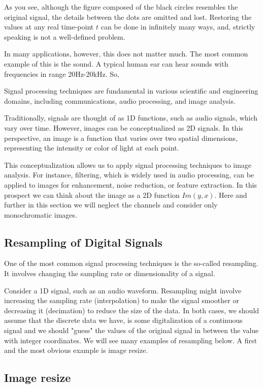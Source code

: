 \documentclass[11pt]{book}
\begin{document}
 
As you see, although the figure composed of the black circles resembles the original signal, the details between the dots are omitted and lost. Restoring the values at any real time-point $t$ can be done in infinitely many ways, and, strictly speaking is not a well-defined problem.

In many applications, however, this does not matter much. The most common example of this is the sound. A typical human ear can hear sounds with frequencies in range 20Hz-20kHz. So,  


Signal processing techniques are fundamental in various scientific and engineering domains, including communications, audio processing, and image analysis.

Traditionally, signals are thought of as 1D functions, such as audio signals, which vary over time. However, images can be conceptualized as 2D signals. In this perspective, an image is a function that varies over two spatial dimensions, representing the intensity or color of light at each point.

This conceptualization allows us to apply signal processing techniques to image analysis. For instance, filtering, which is widely used in audio processing, can be applied to images for enhancement, noise reduction, or feature extraction. In this prospect we can think about the image as a 2D function $Im(y,x)$. Here and further in this section we will neglect the channels and consider only monochromatic images. 

\subsection{Resampling of Digital Signals}

One of the most common signal processing techniques is the so-called resampling. It involves changing the sampling rate or dimensionality of a signal. 

Consider a 1D signal, such as an audio waveform. Resampling might involve increasing the sampling rate (interpolation) to make the signal smoother or decreasing it (decimation) to reduce the size of the data. In both cases, we should assume that the discrete data we have, is some digitalization of a continuous signal and we should "guess" the values of the original signal in between the value with integer coordinates. We will see many examples of resampling below. A first and the most obvious example is image resize.



\subsection{Image resize}
\end{document}
